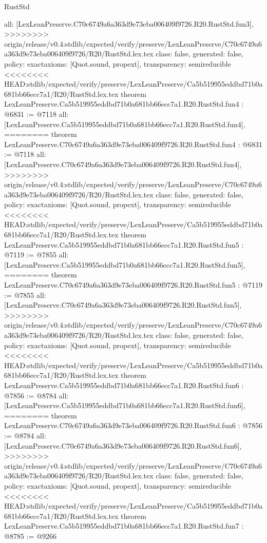 \begin{lexlean}{RustStd}
\begin{coremodule}
{\begin{coremodule}
{{{{{{{  all: [LexLeanPreserve.C70c6749a6a363d9e73eba006409f9726.R20.RustStd.fun3],
>>>>>>>> origin/release/v0.4:stdlib/expected/verify/preserve/LexLeanPreserve/C70c6749a6a363d9e73eba006409f9726/R20/RustStd.lex.tex
  class: false,
  generated: false,
  policy: exact{axioms: [Quot.sound, propext]},
  transparency: semireducible
}
<<<<<<<< HEAD:stdlib/expected/verify/preserve/LexLeanPreserve/Ca5b519955eddbd71b0a681bb66ecc7a1/R20/RustStd.lex.tex
theorem LexLeanPreserve.Ca5b519955eddbd71b0a681bb66ecc7a1.R20.RustStd.fun4 : @6831 := @7118 {
  all: [LexLeanPreserve.Ca5b519955eddbd71b0a681bb66ecc7a1.R20.RustStd.fun4],
========
theorem LexLeanPreserve.C70c6749a6a363d9e73eba006409f9726.R20.RustStd.fun4 : @6831 := @7118 {
  all: [LexLeanPreserve.C70c6749a6a363d9e73eba006409f9726.R20.RustStd.fun4],
>>>>>>>> origin/release/v0.4:stdlib/expected/verify/preserve/LexLeanPreserve/C70c6749a6a363d9e73eba006409f9726/R20/RustStd.lex.tex
  class: false,
  generated: false,
  policy: exact{axioms: [Quot.sound, propext]},
  transparency: semireducible
}
<<<<<<<< HEAD:stdlib/expected/verify/preserve/LexLeanPreserve/Ca5b519955eddbd71b0a681bb66ecc7a1/R20/RustStd.lex.tex
theorem LexLeanPreserve.Ca5b519955eddbd71b0a681bb66ecc7a1.R20.RustStd.fun5 : @7119 := @7855 {
  all: [LexLeanPreserve.Ca5b519955eddbd71b0a681bb66ecc7a1.R20.RustStd.fun5],
========
theorem LexLeanPreserve.C70c6749a6a363d9e73eba006409f9726.R20.RustStd.fun5 : @7119 := @7855 {
  all: [LexLeanPreserve.C70c6749a6a363d9e73eba006409f9726.R20.RustStd.fun5],
>>>>>>>> origin/release/v0.4:stdlib/expected/verify/preserve/LexLeanPreserve/C70c6749a6a363d9e73eba006409f9726/R20/RustStd.lex.tex
  class: false,
  generated: false,
  policy: exact{axioms: [Quot.sound, propext]},
  transparency: semireducible
}
<<<<<<<< HEAD:stdlib/expected/verify/preserve/LexLeanPreserve/Ca5b519955eddbd71b0a681bb66ecc7a1/R20/RustStd.lex.tex
theorem LexLeanPreserve.Ca5b519955eddbd71b0a681bb66ecc7a1.R20.RustStd.fun6 : @7856 := @8784 {
  all: [LexLeanPreserve.Ca5b519955eddbd71b0a681bb66ecc7a1.R20.RustStd.fun6],
========
theorem LexLeanPreserve.C70c6749a6a363d9e73eba006409f9726.R20.RustStd.fun6 : @7856 := @8784 {
  all: [LexLeanPreserve.C70c6749a6a363d9e73eba006409f9726.R20.RustStd.fun6],
>>>>>>>> origin/release/v0.4:stdlib/expected/verify/preserve/LexLeanPreserve/C70c6749a6a363d9e73eba006409f9726/R20/RustStd.lex.tex
  class: false,
  generated: false,
  policy: exact{axioms: [Quot.sound, propext]},
  transparency: semireducible
}
<<<<<<<< HEAD:stdlib/expected/verify/preserve/LexLeanPreserve/Ca5b519955eddbd71b0a681bb66ecc7a1/R20/RustStd.lex.tex
theorem LexLeanPreserve.Ca5b519955eddbd71b0a681bb66ecc7a1.R20.RustStd.fun7 : @8785 := @9266 {
}}}}}}}}}}
\end{coremodule}}
\end{coremodule}
\end{lexlean}
